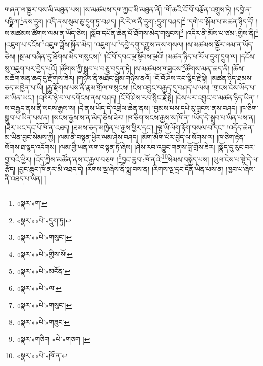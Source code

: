 གཞན་ལ་སྦྱར་བས་མི་མཐུན་པས། །ས་མཚམས་དག་ཀྱང་མི་མཐུན་ནོ། །གོ་ཆའི་ངོ་བོ་བརྩོན་འགྲུས་ཏེ། །དབྱེ་ན་པཉྫི་ཀ་\footnote{«སྣར་»ག་}ནས་དྲུག །འདི་ནས་སུམ་ཅུ་དྲུག་ཏུ་བཤད། །རེ་རེ་ལ་ནི་དྲུག་:དྲུག་བཤད།\footnote{«སྣར་»«པེ་»དྲུག་ཏུ།} །དགེ་བ་སྒོམ་པ་མཚན་ཉིད་དོ། །ས་མཚམས་ཚོགས་ལམ་ན་ཡོད་ཅེས། །སློབ་དཔོན་ཆེན་པོ་ཐོགས་མེད་གསུངས།\footnote{«སྣར་»«པེ་»གསུང་།} །འདིར་ནི་མོས་པ་ཙམ་:གྱིས་ནི།\footnote{«སྣར་»«པེ་»གྱིས་སོ།} །འཇུག་པ་དངོས་\footnote{«སྣར་»«པེ་»མངོན་}འཇུག་ཟློས་སྐྱོན་མེད། །འཇུག་པ་\footnote{«སྣར་»«པེ་»ལ་}དབྱེ་དགུ་དཀྱུས་ནས་གསལ། །ས་མཚམས་སྦྱོར་ལམ་ན་ཡོད་ཅེས། །སྔ་མ་བཞིན་དུ་ཐོགས་མེད་གསུངས།\footnote{«སྣར་»«པེ་»གསུང་།} །ངོ་བོ་དབང་ལྔ་སྟོབས་ལྔའོ། །མཚན་ཉིད་ཕ་རོལ་དྲུག་དྲུག་ལ། །དངོས་སུ་འཇུག་པར་བྱེད་པའོ། །ཚོགས་ཀྱི་སྒྲུབ་པ་བཅུ་བདུན་ཏེ། །ས་མཚམས་གཟུངས་\footnote{«སྣར་»«པེ་»གཟུང་}ཚོགས་མན་ཆད་ནི། །ཆོས་མཆོག་མན་ཆད་དུ་རྫོགས་ཟེར། །གཉིས་ནི་མཐོང་སྒོམ་གཉིས་ནའོ། །ངོ་བོ་ཤེས་རབ་སྙིང་རྗེ་སྟེ། །མཚན་ཉིད་ཐམས་ཅད་མཁྱེན་པ་ཡི། །རྒྱུ་རྫོགས་པས་ནི་རྣམ་གྲོལ་གསུངས། །ངེས་འབྱུང་བརྒྱད་དུ་བཤད་པ་ལས། །གྲངས་ངེས་ཡོད་པ་མ་ཡིན་ཡང་། །འཁོར་ཉེ་བ་ལ་དགོངས་ནས་བཤད། །ངོ་བོ་ཤེས་རབ་སྙིང་རྗེ་སྟེ། །ངེས་པར་འབྱུང་བ་མཚན་ཉིད་ཡིན། །ས་བརྒྱད་ནས་ནི་སངས་རྒྱས་ས། །དེ་ནས་ཡོད་དེ་འགྲེལ་ཆེན་ནས། །བྱམས་པས་དཔེ་རུ་བླངས་ནས་བཤད། །ཁ་ཅིག་སྒྲུབ་པ་ཡིན་པས་ན། །སངས་རྒྱས་ས་ན་མེད་ཅེས་ཟེར། །ཁ་ཅིག་སངས་རྒྱས་ས་ཁོ་ན། །ཡོད་དེ་སྒྲུབ་པ་ཡིན་པས་ན། །ཟེར་ཡང་དང་པོ་ཁོ་ན་འཐད། །ཐམས་ཅད་མཁྱེན་པ་རྒྱས་ཕྱིར་དང་། །ལྷ་ཡི་ལོག་རྟོག་བསལ་བ་དང་། །འདོད་ཆེན་མ་ཡིན་བྱང་སེམས་ཀྱི། །ལམ་ནི་བསྟན་ཕྱིར་ལམ་ཤེས་བཤད། །མོག་མོག་པོར་བྱེད་ལ་སོགས་ལ། །ཁ་ཅིག་རྟེན་སོགས་ཐ་སྙད་འདོགས། །ལམ་གྱི་ཡན་ལག་བསྟན་ཏོ་ཞེས། །ཤེས་རབ་འབྱུང་གནས་བློ་གྲོས་ཟེར། །སྣོད་དུ་རུང་བར་བྱ་བའི་ཕྱིར། །འོད་ཀྱིས་མཚོན་ནས་ང་རྒྱལ་བཅག །\footnote{«སྣར་»གཅིག «པེ་»གཅག །}བྱང་ཆུབ་:ཁོ་ནའི་\footnote{«སྣར་»«པེ་»ཁོ་ན་}སེམས་བསྐྱེད་པས། །ཡུལ་ངེས་པ་སྟེ་དེ་ལ་རྩོད། །བྱང་ཆུབ་ཁོ་ནར་མི་འཐད་དེ། །རིགས་ལྔ་ཞེས་ནི་སྨྲ་བས་ན། །རིགས་ལྔ་དྲང་དོན་ཡིན་པས་ན། །ཁྱབ་པ་ཞེས་ནི་འཐད་པ་ཡིན། །
